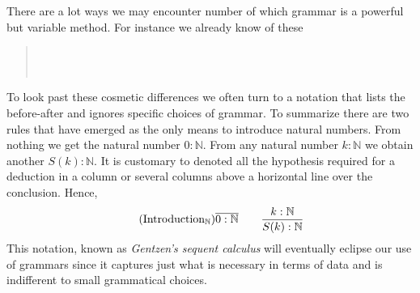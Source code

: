 
There are a lot ways we may encounter number of which grammar is a powerful 
but variable method.  For instance we already know of these
\begin{quote}
    \\
    \\
\end{quote}
To look past these cosmetic differences we often turn to a 
notation that lists the before-after and ignores specific choices of 
grammar.
To summarize there are two rules that have emerged as the only means to introduce 
natural numbers. From nothing we get the natural number $0:\mathbb{N}$.
From any natural number $k:\mathbb{N}$ we obtain another $S(k):\mathbb{N}$.
It is customary to denoted all the hypothesis required for a deduction in a column or 
several columns above a horizontal line over the conclusion.  Hence,
\begin{gather}
    \tag{Introduction$_{\mathbb{N}}$}
    \overline{0:\mathbb{N}}
    \qquad
    \frac{k:\mathbb{N}}{S(k):\mathbb{N}}
\end{gather}
This notation, known as \emph{Gentzen's sequent calculus} will eventually
eclipse our use of grammars since it captures just what is necessary in terms of
data and is indifferent to small grammatical choices.
